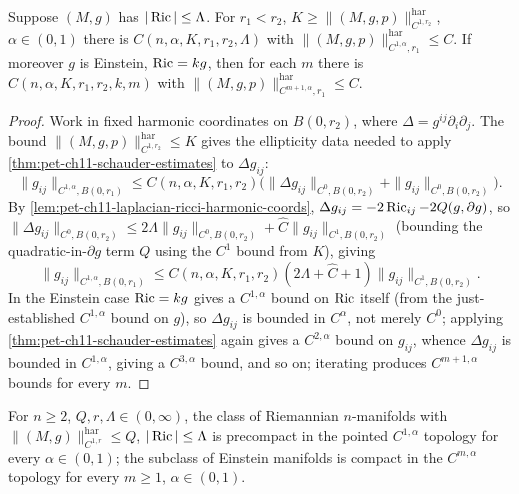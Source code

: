\begin{lemma}
  \label{lem:pet-ch11-anderson-ricci-harmonic-c1alpha-bound}
  Suppose $(M,g)$ has $|\operatorname{Ric}|\le\Lambda$. For $r_1<r_2$,
  $K\ge\|(M,g,p)\|^{\mathrm{har}}_{C^{1,r_2}}$, $\alpha\in(0,1)$ there is
  $C(n,\alpha,K,r_1,r_2,\Lambda)$ with
  $\|(M,g,p)\|^{\mathrm{har}}_{C^{1,\alpha},r_1}\le C$. If moreover $g$ is
  Einstein, $\operatorname{Ric}=kg$, then for each $m$ there is
  $C(n,\alpha,K,r_1,r_2,k,m)$ with
  $\|(M,g,p)\|^{\mathrm{har}}_{C^{m+1,\alpha},r_1}\le C$.
\end{lemma}
\begin{proof}
  Work in fixed harmonic coordinates on $B(0,r_2)$, where
  $\Delta=g^{ij}\partial_i\partial_j$. The bound
  $\|(M,g,p)\|^{\mathrm{har}}_{C^{1,r_2}}\le K$ gives the ellipticity data
  needed to apply \cref{thm:pet-ch11-schauder-estimates} to $\Delta g_{ij}$:
  \[
    \|g_{ij}\|_{C^{1,\alpha},B(0,r_1)}\le C(n,\alpha,K,r_1,r_2)\big(\|\Delta g_{ij}\|_{C^0,B(0,r_2)}+\|g_{ij}\|_{C^0,B(0,r_2)}\big).
  \]
  By \cref{lem:pet-ch11-laplacian-ricci-harmonic-coords},
  $\Delta g_{ij}=-2\operatorname{Ric}_{ij}-2Q(g,\partial g)$, so
  $\|\Delta g_{ij}\|_{C^0,B(0,r_2)}\le2\Lambda\|g_{ij}\|_{C^0,B(0,r_2)}+\hat C\|g_{ij}\|_{C^1,B(0,r_2)}$
  (bounding the quadratic-in-$\partial g$ term $Q$ using the $C^1$ bound from
  $K$), giving
  \[
    \|g_{ij}\|_{C^{1,\alpha},B(0,r_1)}\le C(n,\alpha,K,r_1,r_2)(2\Lambda+\hat C+1)\|g_{ij}\|_{C^1,B(0,r_2)}.
  \]
  In the Einstein case $\operatorname{Ric}=kg$ gives a $C^{1,\alpha}$ bound on $\operatorname{Ric}$
  itself (from the just-established $C^{1,\alpha}$ bound on $g$), so
  $\Delta g_{ij}$ is bounded in $C^\alpha$, not merely $C^0$; applying
  \cref{thm:pet-ch11-schauder-estimates} again gives a $C^{2,\alpha}$ bound
  on $g_{ij}$, whence $\Delta g_{ij}$ is bounded in $C^{1,\alpha}$, giving a
  $C^{3,\alpha}$ bound, and so on; iterating produces
  $C^{m+1,\alpha}$ bounds for every $m$.
\end{proof}

\begin{corollary}
  \label{cor:pet-ch11-ricci-bounded-precompact-c1alpha}
  For $n\ge2$, $Q,r,\Lambda\in(0,\infty)$, the class of Riemannian
  $n$-manifolds with $\|(M,g)\|^{\mathrm{har}}_{C^{1,r}}\le Q$,
  $|\operatorname{Ric}|\le\Lambda$ is precompact in the pointed $C^{1,\alpha}$ topology for
  every $\alpha\in(0,1)$; the subclass of Einstein manifolds is compact in
  the $C^{m,\alpha}$ topology for every $m\ge1$, $\alpha\in(0,1)$.
\end{corollary}

